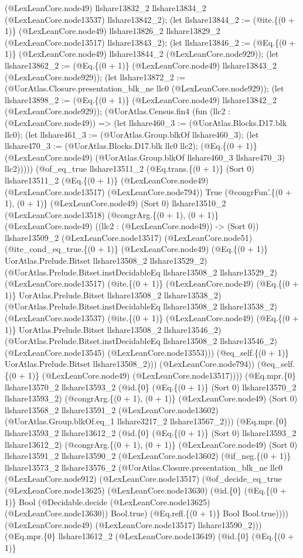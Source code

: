 \documentclass[11pt]{article}
\begin{document}
(@LexLeanCore.node49) llshare13832\_2 llshare13834\_2 (@LexLeanCore.node13537) llshare13842\_2); (let llshare13844\_2 := (@ite.\{(0 + 1)\} (@LexLeanCore.node49) llshare13826\_2 llshare13829\_2 (@LexLeanCore.node13517) llshare13843\_2); (let llshare13846\_2 := (@Eq.\{(0 + 1)\} (@LexLeanCore.node49) llshare13844\_2 (@LexLeanCore.node929)); (let llshare13862\_2 := (@Eq.\{(0 + 1)\} (@LexLeanCore.node49) llshare13843\_2 (@LexLeanCore.node929)); (let llshare13872\_2 := (@UorAtlas.Closure.presentation\_blk\_ne llc0 (@LexLeanCore.node929)); (let llshare13898\_2 := (@Eq.\{(0 + 1)\} (@LexLeanCore.node49) llshare13842\_2 (@LexLeanCore.node929)); (@UorAtlas.Census.fin4 (fun (llc2 : (@LexLeanCore.node49)) => (let llshare460\_3 := (@UorAtlas.Blocks.D17.blk llc0); (let llshare461\_3 := (@UorAtlas.Group.blkOf llshare460\_3); (let llshare470\_3 := (@UorAtlas.Blocks.D17.blk llc0 llc2); (@Eq.\{(0 + 1)\} (@LexLeanCore.node49) (@UorAtlas.Group.blkOf llshare460\_3 llshare470\_3) llc2))))) (@of\_eq\_true llshare13511\_2 (@Eq.trans.\{(0 + 1)\} (Sort 0) llshare13511\_2 (@Eq.\{(0 + 1)\} (@LexLeanCore.node49) (@LexLeanCore.node13517) (@LexLeanCore.node794)) True (@congrFun'.\{(0 + 1), (0 + 1)\} (@LexLeanCore.node49) (Sort 0) llshare13510\_2 (@LexLeanCore.node13518) (@congrArg.\{(0 + 1), (0 + 1)\} (@LexLeanCore.node49) ((llc2 : (@LexLeanCore.node49)) -> (Sort 0)) llshare13509\_2 (@LexLeanCore.node13517) (@LexLeanCore.node51) (@ite\_cond\_eq\_true.\{(0 + 1)\} (@LexLeanCore.node49) (@Eq.\{(0 + 1)\} UorAtlas.Prelude.Bitset llshare13508\_2 llshare13529\_2) (@UorAtlas.Prelude.Bitset.instDecidableEq llshare13508\_2 llshare13529\_2) (@LexLeanCore.node13517) (@ite.\{(0 + 1)\} (@LexLeanCore.node49) (@Eq.\{(0 + 1)\} UorAtlas.Prelude.Bitset llshare13508\_2 llshare13538\_2) (@UorAtlas.Prelude.Bitset.instDecidableEq llshare13508\_2 llshare13538\_2) (@LexLeanCore.node13537) (@ite.\{(0 + 1)\} (@LexLeanCore.node49) (@Eq.\{(0 + 1)\} UorAtlas.Prelude.Bitset llshare13508\_2 llshare13546\_2) (@UorAtlas.Prelude.Bitset.instDecidableEq llshare13508\_2 llshare13546\_2) (@LexLeanCore.node13545) (@LexLeanCore.node13553))) (@eq\_self.\{(0 + 1)\} UorAtlas.Prelude.Bitset llshare13508\_2))) (@LexLeanCore.node794)) (@eq\_self.\{(0 + 1)\} (@LexLeanCore.node49) (@LexLeanCore.node13517)))) (@Eq.mpr.\{0\} llshare13570\_2 llshare13593\_2 (@id.\{0\} (@Eq.\{(0 + 1)\} (Sort 0) llshare13570\_2 llshare13593\_2) (@congrArg.\{(0 + 1), (0 + 1)\} (@LexLeanCore.node49) (Sort 0) llshare13568\_2 llshare13591\_2 (@LexLeanCore.node13602) (@UorAtlas.Group.blkOf.eq\_1 llshare3217\_2 llshare13567\_2))) (@Eq.mpr.\{0\} llshare13593\_2 llshare13612\_2 (@id.\{0\} (@Eq.\{(0 + 1)\} (Sort 0) llshare13593\_2 llshare13612\_2) (@congrArg.\{(0 + 1), (0 + 1)\} (@LexLeanCore.node49) (Sort 0) llshare13591\_2 llshare13590\_2 (@LexLeanCore.node13602) (@if\_neg.\{(0 + 1)\} llshare13573\_2 llshare13576\_2 (@UorAtlas.Closure.presentation\_blk\_ne llc0 (@LexLeanCore.node912) (@LexLeanCore.node13517) (@of\_decide\_eq\_true (@LexLeanCore.node13625) (@LexLeanCore.node13630) (@id.\{0\} (@Eq.\{(0 + 1)\} Bool (@Decidable.decide (@LexLeanCore.node13625) (@LexLeanCore.node13630)) Bool.true) (@Eq.refl.\{(0 + 1)\} Bool Bool.true)))) (@LexLeanCore.node49) (@LexLeanCore.node13517) llshare13590\_2))) (@Eq.mpr.\{0\} llshare13612\_2 (@LexLeanCore.node13649) (@id.\{0\} (@Eq.\{(0 + 1)\} 
\end{document}
